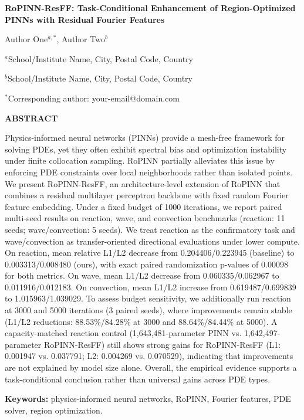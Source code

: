 \documentclass[10pt]{article}
\begin{document}
\thispagestyle{empty}

\begin{center}
{\fontsize{16pt}{18pt}\selectfont\bfseries
RoPINN-ResFF: Task-Conditional Enhancement of Region-Optimized PINNs with Residual Fourier Features\par}
\vspace{0.9em}
{\fontsize{12pt}{14pt}\selectfont
Author One$^{a,*}$, Author Two$^{b}$\par}
\vspace{0.5em}
{\fontsize{12pt}{14pt}\selectfont
$^{a}$School/Institute Name, City, Postal Code, Country\par
$^{b}$School/Institute Name, City, Postal Code, Country\par
$^{*}$Corresponding author: your-email@domain.com\par}
\end{center}

\vspace{0.8em}
\begin{center}
{\fontsize{11pt}{13pt}\selectfont\bfseries ABSTRACT}
\end{center}
\noindent
Physics-informed neural networks (PINNs) provide a mesh-free framework for solving PDEs, yet they often exhibit spectral bias and optimization instability under finite collocation sampling. RoPINN partially alleviates this issue by enforcing PDE constraints over local neighborhoods rather than isolated points. We present RoPINN-ResFF, an architecture-level extension of RoPINN that combines a residual multilayer perceptron backbone with fixed random Fourier feature embedding. Under a fixed budget of 1000 iterations, we report paired multi-seed results on reaction, wave, and convection benchmarks (reaction: 11 seeds; wave/convection: 5 seeds). We treat reaction as the confirmatory task and wave/convection as transfer-oriented directional evaluations under lower compute. On reaction, mean relative L1/L2 decrease from 0.204406/0.223945 (baseline) to 0.003313/0.008480 (ours), with exact paired randomization p-values of 0.00098 for both metrics. On wave, mean L1/L2 decrease from 0.060335/0.062967 to 0.011916/0.012183. On convection, mean L1/L2 increase from 0.619487/0.699839 to 1.015963/1.039029. To assess budget sensitivity, we additionally run reaction at 3000 and 5000 iterations (3 paired seeds), where improvements remain stable (L1/L2 reductions: 88.53\%/84.28\% at 3000 and 88.64\%/84.44\% at 5000). A capacity-matched reaction control (1,643,481-parameter PINN vs. 1,642,497-parameter RoPINN-ResFF) still shows strong gains for RoPINN-ResFF (L1: 0.001947 vs. 0.037791; L2: 0.004269 vs. 0.070529), indicating that improvements are not explained by model size alone. Overall, the empirical evidence supports a task-conditional conclusion rather than universal gains across PDE types.

\vspace{0.5em}
\noindent\textbf{Keywords:} physics-informed neural networks, RoPINN, Fourier features, PDE solver, region optimization.










\end{document}
